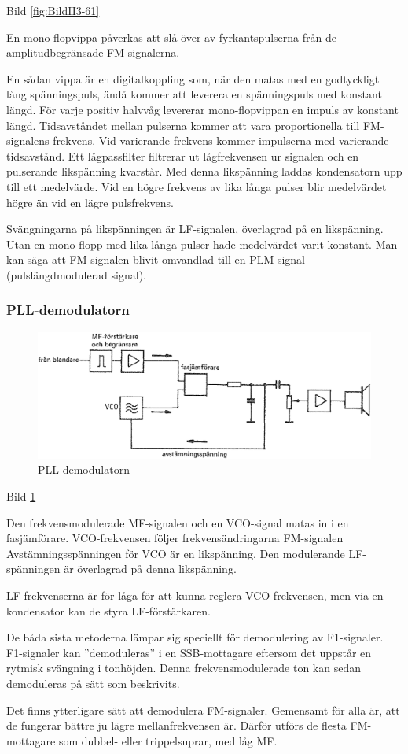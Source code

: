 Bild \ref{fig:BildII3-61}

En mono-flopvippa påverkas att slå över av fyrkantspulserna från de
amplitudbegränsade FM-signalerna.

En sådan vippa är en digitalkoppling som, när den matas med en
godtyckligt lång spänningspuls, ändå kommer att leverera en
spänningspuls med konstant längd. För varje positiv halvvåg levererar
mono-flopvippan en impuls av konstant längd. Tidsavståndet mellan
pulserna kommer att vara proportionella till FM-signalens
frekvens. Vid varierande frekvens kommer impulserna med varierande
tidsavstånd. Ett lågpassfilter filtrerar ut lågfrekvensen ur signalen
och en pulserande likspänning kvarstår. Med denna likspänning laddas
kondensatorn upp till ett medelvärde. Vid en högre frekvens av lika
långa pulser blir medelvärdet högre än vid en lägre pulsfrekvens.

Svängningarna på likspänningen är LF-signalen, överlagrad på en
likspänning. Utan en mono-flopp med lika långa pulser hade medelvärdet
varit konstant. Man kan säga att FM-signalen blivit omvandlad till en
PLM-signal (pulslängdmodulerad signal).

\subsubsection{PLL-demodulatorn}

\begin{figure}
\includegraphics[width=\textwidth]{images/cropped_pdfs/bild_2_3-62.pdf}
\caption{PLL-demodulatorn}
\label{fig:BildII3-62}
\end{figure}

Bild \ref{fig:BildII3-62}

Den frekvensmodulerade MF-signalen och en VCO-signal matas in i en
fasjämförare. VCO-frekvensen följer frekvensändringarna FM-signalen
Avstämningsspänningen för VCO är en likspänning. Den modulerande
LF-spänningen är överlagrad på denna likspänning.

LF-frekvenserna är för låga för att kunna reglera VCO-frekvensen, men
via en kondensator kan de styra LF-förstärkaren.

De båda sista metoderna lämpar sig speciellt för demodulering av
F1-signaler. F1-signaler kan ''demoduleras'' i en SSB-mottagare eftersom
det uppstår en rytmisk svängning i tonhöjden. Denna frekvensmodulerade
ton kan sedan demoduleras på sätt som beskrivits.

Det finns ytterligare sätt att demodulera FM-signaler. Gemensamt för
alla är, att de fungerar bättre ju lägre mellanfrekvensen är.  Därför
utförs de flesta FM-mottagare som dubbel- eller trippelsuprar, med låg
MF.
